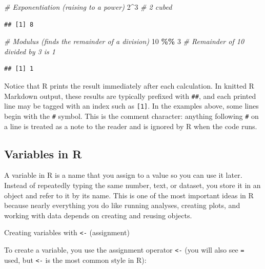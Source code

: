 \documentclass[
  11pt,
]{article}
\newenvironment{Shaded}{\begin{snugshade}}{\end{snugshade}}
\newcommand{\CommentTok}[1]{\textcolor[rgb]{0.56,0.35,0.01}{\textit{#1}}}
\newcommand{\DecValTok}[1]{\textcolor[rgb]{0.00,0.00,0.81}{#1}}
\newcommand{\SpecialCharTok}[1]{\textcolor[rgb]{0.81,0.36,0.00}{\textbf{#1}}}
\begin{document}
\begin{Shaded}
\begin{Highlighting}[]
\CommentTok{\# Exponentiation (raising to a power)}
\DecValTok{2}\SpecialCharTok{\^{}}\DecValTok{3}  \CommentTok{\# 2 cubed}
\end{Highlighting}
\end{Shaded}

\begin{verbatim}
## [1] 8
\end{verbatim}

\begin{Shaded}
\begin{Highlighting}[]
\CommentTok{\# Modulus (finds the remainder of a division)}
\DecValTok{10} \SpecialCharTok{\%\%} \DecValTok{3} \CommentTok{\# Remainder of 10 divided by 3 is 1}
\end{Highlighting}
\end{Shaded}

\begin{verbatim}
## [1] 1
\end{verbatim}

Notice that R prints the result immediately after each calculation. In
knitted R Markdown output, these results are typically prefixed with
\texttt{\#\#}, and each printed line may be tagged with an index such as
\texttt{{[}1{]}}. In the examples above, some lines begin with the
\texttt{\#} symbol. This is the comment character: anything following
\texttt{\#} on a line is treated as a note to the reader and is ignored
by R when the code runs.

\subsection{Variables in R}\label{variables-in-r}

A variable in R is a name that you assign to a value so you can use it
later. Instead of repeatedly typing the same number, text, or dataset,
you store it in an object and refer to it by its name. This is one of
the most important ideas in R because nearly everything you do like
running analyses, creating plots, and working with data depends on
creating and reusing objects.

Creating variables with \texttt{\textless{}-} (assignment)

To create a variable, you use the assignment operator
\texttt{\textless{}-} (you will also see \texttt{=} used, but
\texttt{\textless{}-} is the most common style in R):
\end{document}
